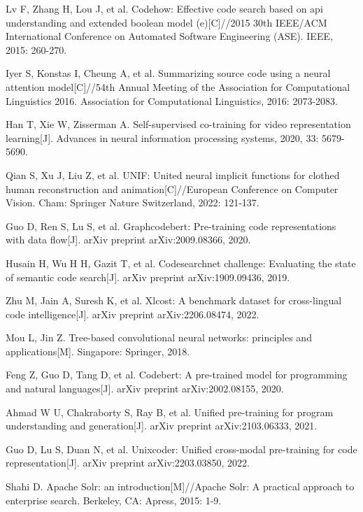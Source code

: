 \documentclass[UTF8,a4paper,12pt]{ctexart}
\numberwithin{equation}{section}
\begin{document}
\begin{thebibliography}{1}
\setlength{\itemsep}{0pt}
 Lv F, Zhang H, Lou J, et al. Codehow: Effective code search based on api understanding and extended boolean model (e)[C]//2015 30th IEEE/ACM International Conference on Automated Software Engineering (ASE). IEEE, 2015: 260-270.

 Iyer S, Konstas I, Cheung A, et al. Summarizing source code using a neural attention model[C]//54th Annual Meeting of the Association for Computational Linguistics 2016. Association for Computational Linguistics, 2016: 2073-2083.

 Han T, Xie W, Zisserman A. Self-supervised co-training for video representation learning[J]. Advances in neural information processing systems, 2020, 33: 5679-5690.

 Qian S, Xu J, Liu Z, et al. UNIF: United neural implicit functions for clothed human reconstruction and animation[C]//European Conference on Computer Vision. Cham: Springer Nature Switzerland, 2022: 121-137.

 Guo D, Ren S, Lu S, et al. Graphcodebert: Pre-training code representations with data flow[J]. arXiv preprint arXiv:2009.08366, 2020.

 Husain H, Wu H H, Gazit T, et al. Codesearchnet challenge: Evaluating the state of semantic code search[J]. arXiv preprint arXiv:1909.09436, 2019.

 Zhu M, Jain A, Suresh K, et al. Xlcost: A benchmark dataset for cross-lingual code intelligence[J]. arXiv preprint arXiv:2206.08474, 2022.

 Mou L, Jin Z. Tree-based convolutional neural networks: principles and applications[M]. Singapore: Springer, 2018.

 Feng Z, Guo D, Tang D, et al. Codebert: A pre-trained model for programming and natural languages[J]. arXiv preprint arXiv:2002.08155, 2020.

 Ahmad W U, Chakraborty S, Ray B, et al. Unified pre-training for program understanding and generation[J]. arXiv preprint arXiv:2103.06333, 2021.

 Guo D, Lu S, Duan N, et al. Unixcoder: Unified cross-modal pre-training for code representation[J]. arXiv preprint arXiv:2203.03850, 2022.

 Shahi D. Apache Solr: an introduction[M]//Apache Solr: A practical approach to enterprise search. Berkeley, CA: Apress, 2015: 1-9.


\end{thebibliography}
\end{document}
